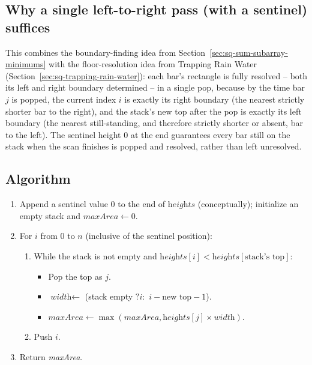 \subsection*{Why a single left-to-right pass (with a sentinel) suffices}

This combines the boundary-finding idea from
Section~\ref{sec:sq-sum-subarray-minimums} with the floor-resolution idea
from Trapping Rain Water (Section~\ref{sec:sq-trapping-rain-water}): each
bar's rectangle is fully resolved -- both its left and right boundary
determined -- in a single pop, because by the time bar $j$ is popped, the
current index $i$ is exactly its right boundary (the nearest strictly
shorter bar to the right), and the stack's new top after the pop is
exactly its left boundary (the nearest still-standing, and therefore
strictly shorter or absent, bar to the left). The sentinel height $0$ at
the end guarantees every bar still on the stack when the scan finishes is
popped and resolved, rather than left unresolved.

\subsection*{Algorithm}

\begin{enumerate}
  \item Append a sentinel value $0$ to the end of $\textit{heights}$
        (conceptually); initialize an empty stack and
        $\textit{maxArea} \gets 0$.
  \item For $i$ from $0$ to $n$ (inclusive of the sentinel position):
  \begin{enumerate}
    \item While the stack is not empty and
          $\textit{heights}[i] < \textit{heights}[\text{stack's top}]$:
    \begin{itemize}
      \item Pop the top as $j$.
      \item $\textit{width} \gets$ (stack empty $? i :$
            $i - \text{new top} - 1$).
      \item $\textit{maxArea} \gets \max(\textit{maxArea},
            \textit{heights}[j] \times \textit{width})$.
    \end{itemize}
    \item Push $i$.
  \end{enumerate}
  \item Return \textit{maxArea}.
\end{enumerate}

